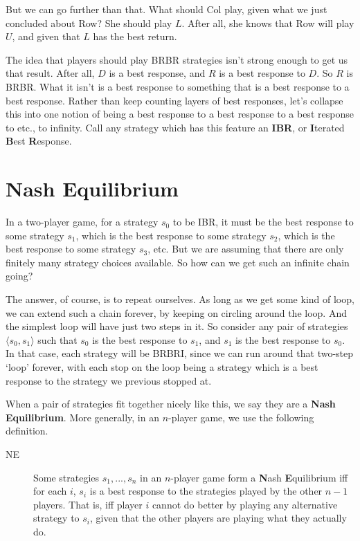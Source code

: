 \documentclass[openany]{book}
\begin{document}
But we can go further than that. What should Col play, given what we just concluded about Row? She should play $L$. After all, she knows that Row will play $U$, and given that $L$ has the best return.

The idea that players should play BRBR strategies isn't strong enough to get us that result. After all, $D$ is a best response, and $R$ is a best response to $D$. So $R$ is BRBR. What it isn't is a best response to something that is a best response to a best response. Rather than keep counting layers of best responses, let's collapse this into one notion of being a best response to a best response to a best response to etc., to infinity. Call any strategy which has this feature an \textbf{IBR}, or \textbf{I}terated \textbf{B}est \textbf{R}esponse.

\section{Nash Equilibrium}
In a two-player game, for a strategy $s_0$ to be IBR, it must be the best response to some strategy $s_1$, which is the best response to some strategy $s_2$, which is the best response to some strategy $s_3$, etc. But we are assuming that there are only finitely many strategy choices available. So how can we get such an infinite chain going?

The answer, of course, is to repeat ourselves. As long as we get some kind of loop, we can extend such a chain forever, by keeping on circling around the loop. And the simplest loop will have just two steps in it. So consider any pair of strategies $\langle s_0, s_1 \rangle$ such that $s_0$ is the best response to $s_1$, and $s_1$ is the best response to $s_0$. In that case, each strategy will be BRBRI, since we can run around that two-step `loop' forever, with each stop on the loop being a strategy which is a best response to the strategy we previous stopped at.

When a pair of strategies fit together nicely like this, we say they are a \textbf{Nash Equilibrium}. More generally, in an $n$-player game, we use the following definition.

\begin{description}
\item[NE] Some strategies $s_1, ..., s_n$ in an $n$-player game form a \textbf{N}ash \textbf{E}quilibrium iff for each $i$, $s_i$ is a best response to the strategies played by the other $n-1$ players. That is, iff player $i$ cannot do better by playing any alternative strategy to $s_i$, given that the other players are playing what they actually do.
\end{description}
\end{document}
